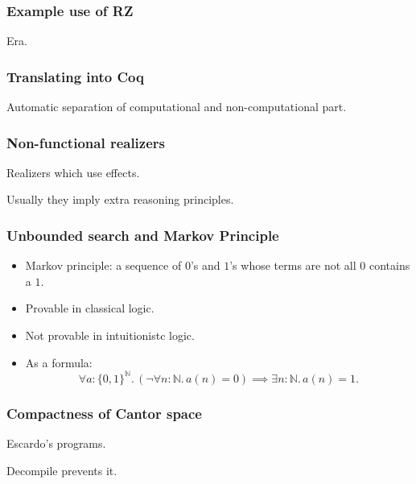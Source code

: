 \documentclass[t]{beamer}
\newcommand{\NN}{\mathbb{N}}
\begin{document}
\begin{frame}
  \frametitle{Example use of RZ}

  Era.
\end{frame}

\begin{frame}
  \frametitle{Translating into Coq}

  Automatic separation of computational and non-computational part.
\end{frame}

\begin{frame}
  \frametitle{Non-functional realizers}

  Realizers which use effects.

  Usually they imply extra reasoning principles.
\end{frame}

\begin{frame}
  \frametitle{Unbounded search and Markov Principle}

  \begin{itemize}
  \item Markov principle: a sequence of $0$'s and $1$'s whose terms
    are not all $0$ contains a $1$.
  \item Provable in classical logic.
  \item Not provable in intuitionistc logic.
  \item As a formula:
    \begin{equation*}
      \forall a : \{0,1\}^\NN .\,
      (\lnot \forall n : \NN .\, a(n) = 0) \implies
      \exists n : \NN .\, a(n) = 1.
    \end{equation*}
  \end{itemize}
\end{frame}

\begin{frame}
  \frametitle{Compactness of Cantor space}

  Escardo's programs.

  Decompile prevents it.
\end{frame}
\end{document}
